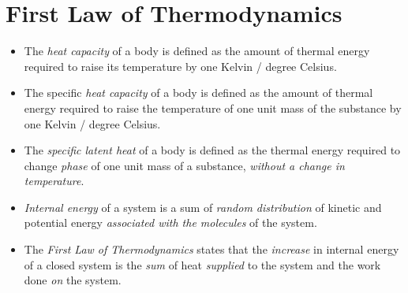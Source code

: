 \documentclass[oneside]{book}
\begin{document}
\chapter{First Law of Thermodynamics}
\begin{itemize}
    \item The \textit{heat capacity} of a body is defined as the amount of thermal energy required to raise its temperature by one Kelvin / degree Celsius.
    \item The specific \textit{heat capacity} of a body is defined as the amount of thermal energy required to raise the temperature of one unit mass of the substance by one Kelvin / degree Celsius.
    \item The \textit{specific latent heat} of a body is defined as the thermal energy required to change \emph{phase} of one unit mass of a substance, \emph{without a change in temperature}.
    \item \textit{Internal energy} of a system is a sum of \emph{random distribution} of kinetic and potential energy \emph{associated with the molecules} of the system.
    \item The \textit{First Law of Thermodynamics} states that the \emph{increase} in internal energy of a closed system is the \emph{sum} of heat \emph{supplied} to the system and the work done \emph{on} the system. 
\end{itemize}
\end{document}
